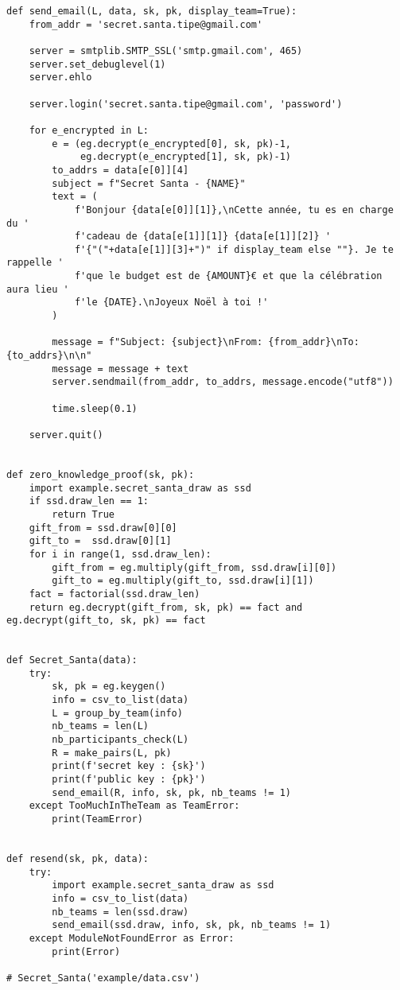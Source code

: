 \documentclass[a4paper, 12pt]{report}
\begin{document}
\begin{longlisting}
\begin{verbatim}
def send_email(L, data, sk, pk, display_team=True):
    from_addr = 'secret.santa.tipe@gmail.com'

    server = smtplib.SMTP_SSL('smtp.gmail.com', 465)
    server.set_debuglevel(1)
    server.ehlo

    server.login('secret.santa.tipe@gmail.com', 'password')

    for e_encrypted in L:
        e = (eg.decrypt(e_encrypted[0], sk, pk)-1,
             eg.decrypt(e_encrypted[1], sk, pk)-1)
        to_addrs = data[e[0]][4]
        subject = f"Secret Santa - {NAME}"
        text = (
            f'Bonjour {data[e[0]][1]},\nCette année, tu es en charge du '
            f'cadeau de {data[e[1]][1]} {data[e[1]][2]} '
            f'{"("+data[e[1]][3]+")" if display_team else ""}. Je te rappelle '
            f'que le budget est de {AMOUNT}€ et que la célébration aura lieu '
            f'le {DATE}.\nJoyeux Noël à toi !'
        )

        message = f"Subject: {subject}\nFrom: {from_addr}\nTo: {to_addrs}\n\n"
        message = message + text
        server.sendmail(from_addr, to_addrs, message.encode("utf8"))

        time.sleep(0.1)

    server.quit()


def zero_knowledge_proof(sk, pk):
    import example.secret_santa_draw as ssd
    if ssd.draw_len == 1:
        return True
    gift_from = ssd.draw[0][0]
    gift_to =  ssd.draw[0][1]
    for i in range(1, ssd.draw_len):
        gift_from = eg.multiply(gift_from, ssd.draw[i][0])
        gift_to = eg.multiply(gift_to, ssd.draw[i][1])
    fact = factorial(ssd.draw_len)
    return eg.decrypt(gift_from, sk, pk) == fact and eg.decrypt(gift_to, sk, pk) == fact


def Secret_Santa(data):
    try:
        sk, pk = eg.keygen()
        info = csv_to_list(data)
        L = group_by_team(info)
        nb_teams = len(L)
        nb_participants_check(L)
        R = make_pairs(L, pk)
        print(f'secret key : {sk}')
        print(f'public key : {pk}')
        send_email(R, info, sk, pk, nb_teams != 1)
    except TooMuchInTheTeam as TeamError:
        print(TeamError)


def resend(sk, pk, data):
    try:
        import example.secret_santa_draw as ssd
        info = csv_to_list(data)
        nb_teams = len(ssd.draw)
        send_email(ssd.draw, info, sk, pk, nb_teams != 1)
    except ModuleNotFoundError as Error:
        print(Error)

# Secret_Santa('example/data.csv')
                \end{verbatim}
            \end{longlisting}
            
\end{document}
